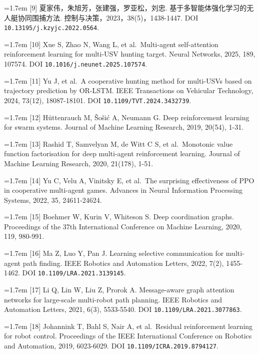 \documentclass[UTF8,10.5pt,a4paper,fontset=none]{ctexart}
\begin{document}
\noindent\hangindent=1.7em [9] 夏家伟，朱旭芳，张建强，罗亚松，刘忠.
基于多智能体强化学习的无人艇协同围捕方法.
控制与决策，2023，38(5)，1438-1447. DOI \nolinkurl{10.13195/j.kzyjc.2022.0564}.

\noindent\hangindent=1.7em [10] Xue S, Zhao N, Wang L, et al.~Multi-agent self-attention
reinforcement learning for multi-USV hunting target. Neural Networks,
2025, 189, 107574. DOI \nolinkurl{10.1016/j.neunet.2025.107574}.

\noindent\hangindent=1.7em [11] Yu J, et al.~A cooperative hunting method for multi-USVs based
on trajectory prediction by OR-LSTM. IEEE Transactions on Vehicular
Technology, 2024, 73(12), 18087-18101. DOI \nolinkurl{10.1109/TVT.2024.3432739}.

\noindent\hangindent=1.7em [12] Hüttenrauch M, Šošić A, Neumann G. Deep reinforcement learning
for swarm systems. Journal of Machine Learning Research, 2019, 20(54),
1-31.

\noindent\hangindent=1.7em [13] Rashid T, Samvelyan M, de Witt C S, et al.~Monotonic value
function factorisation for deep multi-agent reinforcement learning.
Journal of Machine Learning Research, 2020, 21(178), 1-51.

\noindent\hangindent=1.7em [14] Yu C, Velu A, Vinitsky E, et al.~The surprising effectiveness
of PPO in cooperative multi-agent games. Advances in Neural Information
Processing Systems, 2022, 35, 24611-24624.

\noindent\hangindent=1.7em [15] Boehmer W, Kurin V, Whiteson S. Deep coordination graphs.
Proceedings of the 37th International Conference on Machine Learning,
2020, 119, 980-991.

\noindent\hangindent=1.7em [16] Ma Z, Luo Y, Pan J. Learning selective communication for
multi-agent path finding. IEEE Robotics and Automation Letters, 2022,
7(2), 1455-1462. DOI \nolinkurl{10.1109/LRA.2021.3139145}.

\noindent\hangindent=1.7em [17] Li Q, Lin W, Liu Z, Prorok A. Message-aware graph attention
networks for large-scale multi-robot path planning. IEEE Robotics and
Automation Letters, 2021, 6(3), 5533-5540. DOI \nolinkurl{10.1109/LRA.2021.3077863}.

\noindent\hangindent=1.7em [18] Johannink T, Bahl S, Nair A, et al.~Residual reinforcement
learning for robot control. Proceedings of the IEEE International
Conference on Robotics and Automation, 2019, 6023-6029. DOI \nolinkurl{10.1109/ICRA.2019.8794127}.
\end{document}
